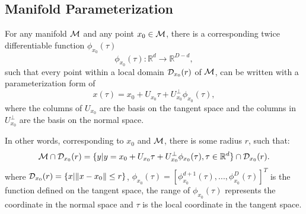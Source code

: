 \documentclass{article}
\theoremstyle{remark}
\begin{document}
\subsection{Manifold Parameterization}
For any manifold $\cal M$ and any point $x_0\in \cal M$, there is a corresponding twice differentiable function $\phi_{x_0}(\tau)$ 
\[
\phi_{x_0}(\tau):{\mathbb R}^d\rightarrow {\mathbb R}^{D-d},
\]
such that every point within a local domain ${\cal D}_{x_0}(r)$ of $\cal M$, can be written with a parameterization form of 
\begin{equation}\label{manifold}
x(\tau)=  x_0 + U_{x_0} \tau+ U_{x_0}^{\perp} \phi_{x_0} (\tau),
\end{equation}
where the columns of $U_{x_0}$ are the basis on the tangent space and the columns in $U_{x_0}^{\perp}$ are the basis on the normal space. 


In other words, corresponding to $x_0$ and $\cal M$, there is some radius $r$, such that:
\begin{equation}\label{model}
 {\cal M}\cap {\cal D}_{x_0}(r) =  \{y | y =  x_0 + U_{x_0} \tau+ U_{x_0}^{\perp} \phi_{x_0} (\tau), \tau\in {\mathbb R}^d\}\cap {\cal D}_{x_0}(r).
\end{equation}
where ${\cal D}_{x_0}(r) = \{x|\|x-x_0\|\leq r\}$, $\phi_{x_0}(\tau)=[\phi_{x_0}^{d+1}(\tau),...,\phi_{x_0}^{D}(\tau)]^T$  is the function defined on the tangent space, the range of $\phi_{x_0}(\tau)$ represents the coordinate in the normal space and $\tau$ is the local coordinate in the tangent space.
\end{document}
